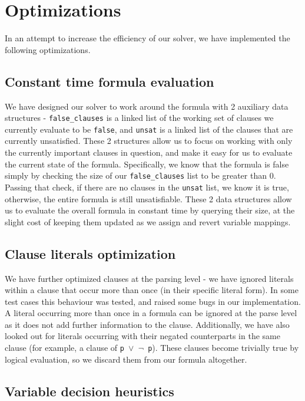 \documentclass[a4paper]{article}
\begin{document}
\section{Optimizations}

In an attempt to increase the efficiency of our solver, we have implemented the following optimizations.

\subsection{Constant time formula evaluation}

We have designed our solver to work around the formula with 2 auxiliary data structures -  \texttt{false\_clauses} is a linked list of the working set of clauses we currently evaluate to be \texttt{false}, and \texttt{unsat} is a linked list of the clauses that are currently unsatisfied. These 2 structures allow us to focus on working with only the currently important clauses in question, and make it easy for us to evaluate the current state of the formula. Specifically, we know that the formula is false simply by checking the size of our \texttt{false\_clauses} list to be greater than 0. Passing that check, if there are no clauses in the \texttt{unsat} list, we know it is true, otherwise, the entire formula is still unsatisfiable. These 2 data structures allow us to evaluate the overall formula in constant time by querying their size, at the slight cost of keeping them updated as we assign and revert variable mappings.

\subsection{Clause literals optimization}
We have further optimized clauses at the parsing level - we have ignored literals within a clause that occur more than once (in their specific literal form). In some test cases this behaviour was tested, and raised some bugs in our implementation. A literal occurring more than once in a formula can be ignored at the parse level as it does not add further information to the clause. Additionally, we have also looked out for literals occurring with their negated counterparts in the same clause (for example, a clause of \texttt{p $\vee$ $\neg$ p}). These clauses become trivially true by logical evaluation, so we discard them from our formula altogether.


\subsection{Variable decision heuristics}
\end{document}
